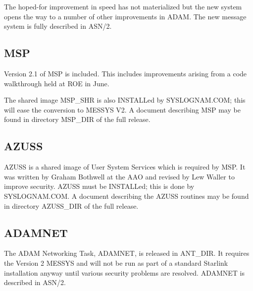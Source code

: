 The hoped-for improvement in speed has not materialized but the new system 
opens the way to a number of other improvements in ADAM.
The new message system is fully described in ASN/2.

\subsection{MSP}
\label{msp}
Version 2.1 of MSP is included.
This includes improvements arising from a code walkthrough held at ROE in June.

The shared image MSP\_SHR is also INSTALLed by SYS\-LOGNAM\-.COM; this will
ease the conversion to MESSYS V2.
A document describing MSP may be found in directory MSP\_DIR of the full
release.

\subsection{AZUSS}
\label{azuss}
AZUSS is a shared image of User System Services which is required by MSP.
It was written by Graham Bothwell at the AAO and revised by Lew Waller to 
improve security.
AZUSS must be INSTALLed; this is done by SYSLOGNAM.COM.
A document describing the AZUSS routines may be found in directory AZUSS\_DIR
of the full release.

\subsection{ADAMNET}
\label{adamnet}
The ADAM Networking Task, ADAMNET, is released in ANT\_DIR.
It requires the Version 2 MESSYS and will not be run as part of a standard 
Starlink installation anyway until various security problems are resolved.
ADAMNET is described in ASN/2.

